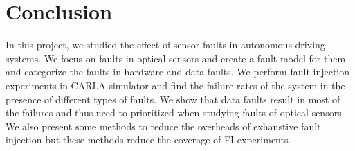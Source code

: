 \section{Conclusion}

In this project, we studied the effect of sensor faults in autonomous driving systems. We focus on faults in optical sensors and create a fault model for them and categorize the faults in hardware and data faults. We perform fault injection experiments in CARLA simulator and find the failure rates of the system in the presence of different types of faults. We show that data faults result in most of the failures and thus need to prioritized when studying faults of optical sensors. We also present some methods to reduce the overheads of exhaustive fault injection but these methods reduce the coverage of FI experiments.